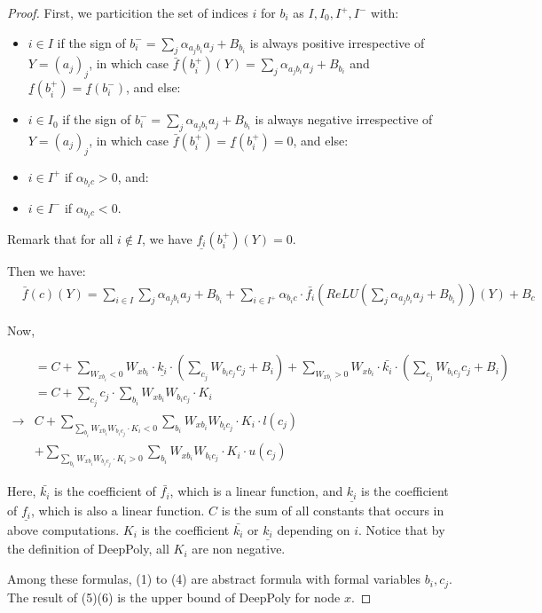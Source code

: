 \documentclass[]{article}
\theoremstyle{definition}
\begin{document}
\begin{proof}
First, we particition the set of indices $i$ for $b_i$ as $I,I_0,I^+,I^-$ with:
\begin{itemize}
	\item $i \in I$ if the sign of $b_i^-=\sum_{j} \alpha_{a_j b_i} a_j + B_{b_i}$ is always positive irrespective of $Y=(a_j)_j$, in which case $\bar{f}(b_i^+)(Y)=\sum_{j} \alpha_{a_j b_i} a_j + B_{b_i}$ and
	$\underline{f}(b_i^+)=\underline{f}(b_i^-)$, and else:
	\item $i \in I_0$ if the sign of $b_i^-=\sum_{j} \alpha_{a_j b_i} a_j + B_{b_i}$ is always negative irrespective of $Y=(a_j)_j$, in which case $\bar{f}(b_i^+)=\underline{f}(b_i^+)=0$,
	and else:
	\item $i \in I^+$ if $\alpha_{b_i c}>0$, and:
	\item $i \in I^-$ if $\alpha_{b_i c}<0$.
	\end{itemize}
	
Remark that for all $i \notin I$, we have $\underline{f_i}(b_i^+)(Y)=0$.
	

Then we have:
\begin{align*}
	&\bar{f}(c)(Y) = 
	\sum_{i \in I} \sum_{j} \alpha_{a_j b_i} a_j + B_{b_i}
	+ \sum_{i \in I^+} \alpha_{b_i c} \cdot \bar{f_i}(ReLU(\sum_{j} \alpha_{a_j b_i} a_j + B_{b_i}))(Y)+ B_c 
	\end{align*}
	
Now,


 \begin{align}
 &= C+\sum_{W_{xb_i}<0}W_{xb_i}\cdot\underline{k_i}\cdot(\sum_{c_j}W_{b_ic_j}c_j+B_i)+\sum_{W_{xb_i}>0}W_{xb_i}\cdot\bar{k_i}\cdot(\sum_{c_j}W_{b_ic_j}c_j+B_i)\\
 &= C+\sum_{c_j}c_j\cdot\sum_{b_i}W_{xb_i}W_{b_ic_j}\cdot K_i\\
 \rightarrow& C+\sum_{\sum_{b_i}W_{xb_i}W_{b_ic_j}\cdot K_i<0}\sum_{b_i}W_{xb_i}W_{b_ic_j}\cdot K_i\cdot l(c_j)\\
 &+\sum_{\sum_{b_i}W_{xb_i}W_{b_ic_j}\cdot K_i>0}\sum_{b_i}W_{xb_i}W_{b_ic_j}\cdot K_i\cdot u(c_j)
\end{align} 

Here, $\bar{k_i}$ is the coefficient of $\bar{f_i}$, which is a linear function, and $\underline{k_i}$ is the coefficient of $\underline{f_i}$, which is also a linear function. $C$ is the sum of all constants that occurs in above computations. $K_i$ is the coefficient $\bar{k_i}$ or $\underline{k_i}$ depending on $i$. Notice that by the definition of DeepPoly, all $K_i$ are non negative. 

Among these formulas, (1) to (4) are abstract formula with formal variables $b_i,c_j$. The result of (5)(6) is the upper bound of DeepPoly for node $x$. 


\end{proof}
\end{document}
